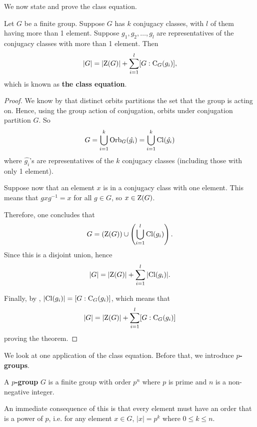 We now state and prove the class equation.
\begin{theorem}\label{thrm-class-equation}
    Let $G$ be a finite group. Suppose $G$ has $k$ conjugacy classes, with $l$ of them having more than 1 element. Suppose $g_1, g_2, \dots, g_l$ are representatives of the conjugacy classes with more than 1 element. Then
    \[
        |G| = |\mathrm{Z}(G)| + \sum_{i=1}^l [G : \mathrm{C}_{G}(g_i)],
    \]
    which is known as \textbf{the class equation}.
\end{theorem}

\begin{proof}
    We know by  that distinct orbits partitions the set that the group is acting on. Hence, using the group action of conjugation, orbits under conjugation partition $G$. So
    \[
        G = \bigcup_{i=1}^k \mathrm{Orb}_{G}(\hat{g_i}) = \bigcup_{i=1}^k \mathrm{Cl}(\hat{g_i})
    \]
    where $\hat{g_i}$'s are representatives of the $k$ conjugacy classes (including those with only 1 element).

    Suppose now that an element $x$ is in a conjugacy class with one element. This means that $gxg^{-1} = x$ for all $g \in G$, so $x \in \mathrm{Z}(G)$.

    Therefore, one concludes that
    \[
        G = \left(\mathrm{Z}(G)\right) \cup \left(\bigcup_{i=1}^l \mathrm{Cl}(g_i)\right).
    \]
    Since this is a disjoint union, hence
    \[
        |G| = |\mathrm{Z}(G)| + \sum_{i=1}^l |\mathrm{Cl}(g_i)|.
    \]

    Finally, by , $|\mathrm{Cl}(g_i)| = [G : \mathrm{C}_{G}(g_i)]$, which means that
    \[
        |G| = |\mathrm{Z}(G)| + \sum_{i=1}^l [G:\mathrm{C}_{G}(g_i)]
    \]
    proving the theorem.
\end{proof}

We look at one application of the class equation. Before that, we introduce \textbf{$p$-groups}.
\begin{definition}
    A \textbf{$p$-group} $G$ is a finite group with order $p^n$ where $p$ is prime and $n$ is a non-negative integer.
\end{definition}
An immediate consequence of this is that every element must have an order that is a power of $p$, i.e. for any element $x \in G$, $|x| = p^k$ where $0 \leq k \leq n$.

